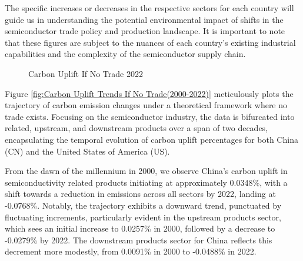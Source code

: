 The specific increases or decreases in the respective sectors for each country will guide us in understanding the potential environmental impact of shifts in the semiconductor trade policy and production landscape. It is important to note that these figures are subject to the nuances of each country's existing industrial capabilities and the complexity of the semiconductor supply chain. 
\ifincludefigures 
\begin{figure}
 \centering
 \caption{Carbon Uplift If No Trade 2022}\label{fig:Carbon Uplift If No Trade 2022}
\end{figure}
\fi
Figure \ref{fig:Carbon Uplift Trends If No Trade(2000-2022)} meticulously plots the trajectory of carbon emission changes under a theoretical framework where no trade exists. Focusing on the semiconductor industry, the data is bifurcated into related, upstream, and downstream products over a span of two decades, encapsulating the temporal evolution of carbon uplift percentages for both China (CN) and the United States of America (US).

From the dawn of the millennium in 2000, we observe China's carbon uplift in semiconductivity related products initiating at approximately 0.0348\%, with a shift towards a reduction in emissions across all sectors by 2022, landing at -0.0768\%. Notably, the trajectory exhibits a downward trend, punctuated by fluctuating increments, particularly evident in the upstream products sector, which sees an initial increase to 0.0257\% in 2000, followed by a decrease to -0.0279\% by 2022. The downstream products sector for China reflects this decrement more modestly, from 0.0091\% in 2000 to -0.0488\% in 2022.

